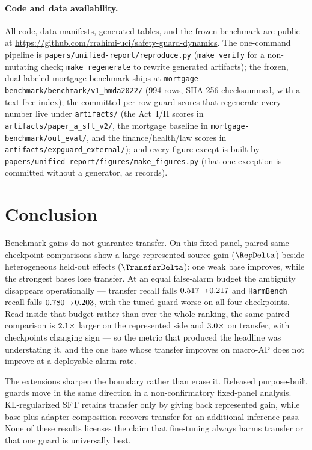 \documentclass[11pt]{article}
\newcommand{\code}[1]{\texttt{\small #1}}
\begin{document}
\paragraph{Code and data availability.} \begin{sloppypar}All code, data manifests, generated tables, and
the frozen benchmark are public at \url{https://github.com/rrahimi-uci/safety-guard-dynamics}. The
one-command pipeline is \code{papers/unified-report/reproduce.py} (\code{make verify} for a non-mutating
check; \code{make regenerate} to rewrite generated artifacts); the frozen,
dual-labeled mortgage benchmark ships at \code{mortgage-benchmark/benchmark/v1\_hmda2022/} (994 rows,
SHA-256-checksummed, with a text-free index); the committed per-row guard scores that regenerate every
number live under \code{artifacts/} (the Act~I/II scores in \code{artifacts/paper\_a\_sft\_v2/}, the
mortgage baseline in \code{mortgage-benchmark/out\_eval/}, and the finance/health/law scores in
\code{artifacts/expguard\_external/}); and every figure except  is built by
\code{papers/unified-report/figures/make\_figures.py} (that one exception is committed without a
generator, as  records).\end{sloppypar}

\section{Conclusion}
\label{sec:conclusion}

Benchmark gains do not guarantee transfer. On this fixed panel, paired same-checkpoint comparisons show
a large represented-source gain ($\RepDelta$) beside heterogeneous held-out effects
($\TransferDelta$): one weak base improves, while the strongest bases lose transfer. At an equal
false-alarm budget the ambiguity disappears operationally --- transfer recall falls
$0.517\!\rightarrow\!0.217$ and \code{HarmBench} recall falls
$0.780\!\rightarrow\!0.203$, with the tuned guard worse on all four checkpoints.
Read inside that budget rather than over the whole ranking, the same paired comparison is
$2.1\times$ larger on the represented side and $3.0\times$
on transfer, with \LowFprSignFlips{} checkpoints changing sign --- so the metric that produced the
headline was understating it, and the one base whose transfer improves on macro-AP does not improve
at a deployable alarm rate.

The extensions sharpen the boundary rather than erase it. Released purpose-built guards move in the
same direction in a non-confirmatory fixed-panel analysis. KL-regularized SFT retains transfer only by
giving back represented gain, while base-plus-adapter composition recovers transfer for an additional
inference pass. None of these results licenses the claim that fine-tuning always harms transfer or that
one guard is universally best.
\end{document}
